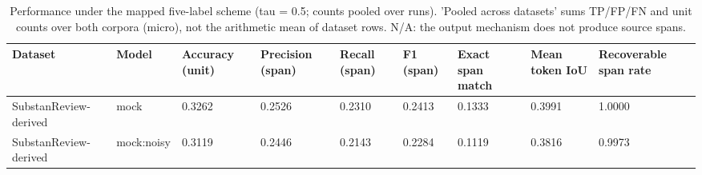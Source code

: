 \begin{table}
\caption{Performance under the mapped five-label scheme (tau = 0.5; counts pooled over runs). 'Pooled across datasets' sums TP/FP/FN and unit counts over both corpora (micro), not the arithmetic mean of dataset rows. N/A: the output mechanism does not produce source spans.}
\label{tab:table_performance}
\begin{tabular}{lllllllll}
\toprule
Dataset & Model & Accuracy (unit) & Precision (span) & Recall (span) & F1 (span) & Exact span match & Mean token IoU & Recoverable span rate \\
\midrule
SubstanReview-derived & mock & 0.3262 & 0.2526 & 0.2310 & 0.2413 & 0.1333 & 0.3991 & 1.0000 \\
SubstanReview-derived & mock:noisy & 0.3119 & 0.2446 & 0.2143 & 0.2284 & 0.1119 & 0.3816 & 0.9973 \\
\bottomrule
\end{tabular}
\end{table}
